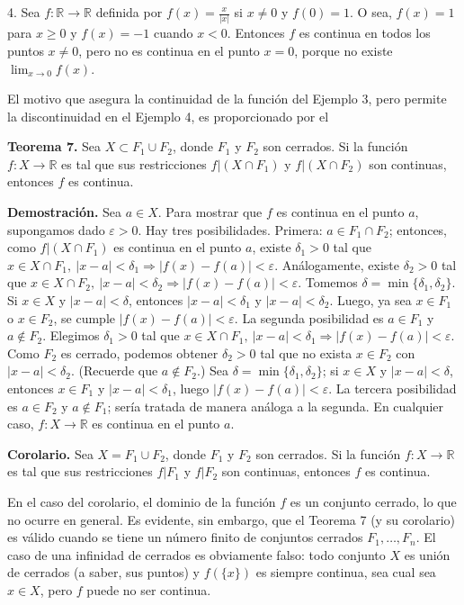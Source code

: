 \documentclass[12pt,oneside]{book}
\begin{document}
4. Sea \(f: \mathbb{R} \to \mathbb{R}\) definida por \(f(x) = \frac{x}{|x|}\) si \(x \neq 0\) y \(f(0) = 1\). O sea, \(f(x) = 1\) para \(x \geq 0\) y \(f(x) = -1\) cuando \(x < 0\). Entonces \(f\) es continua en todos los puntos \(x \neq 0\), pero no es continua en el punto \(x = 0\), porque no existe \(\lim_{x \to 0} f(x)\).

El motivo que asegura la continuidad de la función del Ejemplo 3, pero permite la discontinuidad en el Ejemplo 4, es proporcionado por el

\textbf{Teorema 7.} Sea \(X \subset F_1 \cup F_2\), donde \(F_1\) y \(F_2\) son cerrados. Si la función \(f: X \to \mathbb{R}\) es tal que sus restricciones \(f|(X \cap F_1)\) y \(f|(X \cap F_2)\) son continuas, entonces \(f\) es continua.

\textbf{Demostración.} Sea \(a \in X\). Para mostrar que \(f\) es continua en el punto \(a\), supongamos dado \(\varepsilon > 0\). Hay tres posibilidades. Primera: \(a \in F_1 \cap F_2\); entonces, como \(f|(X \cap F_1)\) es continua en el punto \(a\), existe \(\delta_1 > 0\) tal que \(x \in X \cap F_1,\ |x - a| < \delta_1 \Rightarrow |f(x) - f(a)| < \varepsilon\). Análogamente, existe \(\delta_2 > 0\) tal que \(x \in X \cap F_2,\ |x - a| < \delta_2 \Rightarrow |f(x) - f(a)| < \varepsilon\). Tomemos \(\delta = \min\{\delta_1, \delta_2\}\). Si \(x \in X\) y \(|x - a| < \delta\), entonces \(|x - a| < \delta_1\) y \(|x - a| < \delta_2\). Luego, ya sea \(x \in F_1\) o \(x \in F_2\), se cumple \(|f(x) - f(a)| < \varepsilon\). La segunda posibilidad es \(a \in F_1\) y \(a \notin F_2\). Elegimos \(\delta_1 > 0\) tal que \(x \in X \cap F_1,\ |x - a| < \delta_1 \Rightarrow |f(x) - f(a)| < \varepsilon\). Como \(F_2\) es cerrado, podemos obtener \(\delta_2 > 0\) tal que no exista \(x \in F_2\) con \(|x - a| < \delta_2\). (Recuerde que \(a \notin F_2\).) Sea \(\delta = \min\{\delta_1, \delta_2\}\); si \(x \in X\) y \(|x - a| < \delta\), entonces \(x \in F_1\) y \(|x - a| < \delta_1\), luego \(|f(x) - f(a)| < \varepsilon\). La tercera posibilidad es \(a \in F_2\) y \(a \notin F_1\); sería tratada de manera análoga a la segunda. En cualquier caso, \(f: X \to \mathbb{R}\) es continua en el punto \(a\).

\textbf{Corolario.} Sea \(X = F_1 \cup F_2\), donde \(F_1\) y \(F_2\) son cerrados. Si la función \(f: X \to \mathbb{R}\) es tal que sus restricciones \(f|F_1\) y \(f|F_2\) son continuas, entonces \(f\) es continua.

En el caso del corolario, el dominio de la función \(f\) es un conjunto cerrado, lo que no ocurre en general. Es evidente, sin embargo, que el Teorema 7 (y su corolario) es válido cuando se tiene un número finito de conjuntos cerrados \(F_1, \dots, F_n\). El caso de una infinidad de cerrados es obviamente falso: todo conjunto \(X\) es unión de cerrados (a saber, sus puntos) y \(f(\{x\})\) es siempre continua, sea cual sea \(x \in X\), pero \(f\) puede no ser continua.
\end{document}
